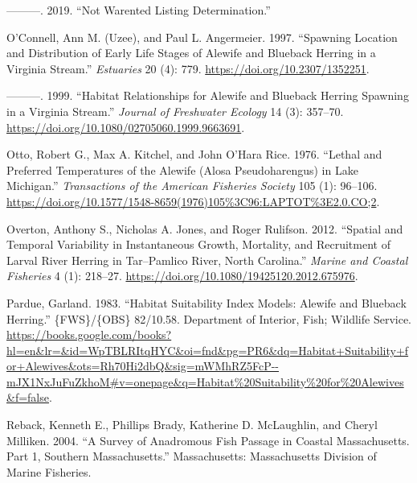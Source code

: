 \documentclass[
]{book}
\newlength{\cslhangindent}
\newlength{\cslentryspacingunit} %
\newenvironment{CSLReferences}[2] %
 {%
  \setlength{\parindent}{0pt}
  \ifodd #1
  \let\oldpar\par
  \def\par{\hangindent=\cslhangindent\oldpar}
  \fi
  \setlength{\parskip}{#2\cslentryspacingunit}
 }%
 {}
\begin{document}
\begin{CSLReferences}{1}{0}
\leavevmode{}%
---------. 2019. {``Not {Warented} {Listing} {Determination}.''}

\leavevmode{}%
O'Connell, Ann M. (Uzee), and Paul L. Angermeier. 1997. {``Spawning {Location} and {Distribution} of {Early} {Life} {Stages} of {Alewife} and {Blueback} {Herring} in a {Virginia} {Stream}.''} \emph{Estuaries} 20 (4): 779. \url{https://doi.org/10.2307/1352251}.

\leavevmode{}%
---------. 1999. {``Habitat {Relationships} for {Alewife} and {Blueback} {Herring} {Spawning} in a {Virginia} {Stream}.''} \emph{Journal of Freshwater Ecology} 14 (3): 357--70. \url{https://doi.org/10.1080/02705060.1999.9663691}.

\leavevmode{}%
Otto, Robert G., Max A. Kitchel, and John O'Hara Rice. 1976. {``Lethal and {Preferred} {Temperatures} of the {Alewife} ({Alosa} Pseudoharengus) in {Lake} {Michigan}.''} \emph{Transactions of the American Fisheries Society} 105 (1): 96--106. \url{https://doi.org/10.1577/1548-8659(1976)105\%3C96:LAPTOT\%3E2.0.CO;2}.

\leavevmode{}%
Overton, Anthony S., Nicholas A. Jones, and Roger Rulifson. 2012. {``Spatial and {Temporal} {Variability} in {Instantaneous} {Growth}, {Mortality}, and {Recruitment} of {Larval} {River} {Herring} in {Tar}--{Pamlico} {River}, {North} {Carolina}.''} \emph{Marine and Coastal Fisheries} 4 (1): 218--27. \url{https://doi.org/10.1080/19425120.2012.675976}.

\leavevmode{}%
Pardue, Garland. 1983. {``Habitat {Suitability} {Index} {Models}: {Alewife} and {Blueback} {Herring}.''} \{FWS\}/\{OBS\} 82/10.58. Department of Interior, Fish; Wildlife Service. \url{https://books.google.com/books?hl=en\&lr=\&id=WpTBLRItqHYC\&oi=fnd\&pg=PR6\&dq=Habitat+Suitability+for+Alewives\&ots=Rh70Hi2dbQ\&sig=mWMhRZ5FcP--mJX1NxJuFuZkhoM\#v=onepage\&q=Habitat\%20Suitability\%20for\%20Alewives\&f=false}.

\leavevmode{}%
Reback, Kenneth E., Phillips Brady, Katherine D. McLaughlin, and Cheryl Milliken. 2004. {``A {Survey} of {Anadromous} {Fish} {Passage} in {Coastal} {Massachusetts}. {Part} 1, {Southern} {Massachusetts}.''} Massachusetts: Massachusetts Division of Marine Fisheries.


\end{CSLReferences}
\end{document}
